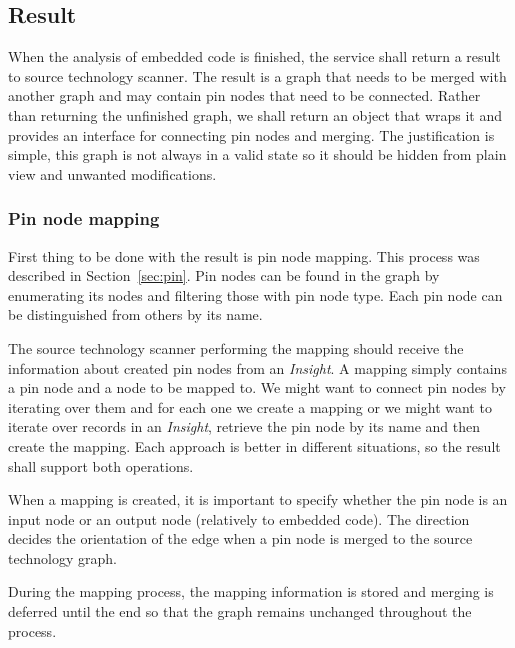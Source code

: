 \subsection{Result}

When the analysis of embedded code is finished, the service shall return a result to source technology scanner. The result is a graph that needs to be merged with another graph and may contain pin nodes that need to be connected. Rather than returning the unfinished graph, we shall return an object that wraps it and provides an interface for connecting pin nodes and merging. The justification is simple, this graph is not always in a valid state so it should be hidden from plain view and unwanted modifications.

\subsubsection{Pin node mapping}
First thing to be done with the result is pin node mapping. This process was described in Section~\ref{sec:pin}. Pin nodes can be found in the graph by enumerating its nodes and filtering those with pin node type. Each pin node can be distinguished from others by its name.
\par
The source technology scanner performing the mapping should receive the information about created pin nodes from an \textit{Insight}. A mapping simply contains a pin node and a node to be mapped to. We might want to connect pin nodes by iterating over them and for each one we create a mapping or we might want to iterate over records in an \textit{Insight}, retrieve the pin node by its name and then create the mapping. Each approach is better in different situations, so the result shall support both operations.
\par
When a mapping is created, it is important to specify whether the pin node is an input node or an output node (relatively to embedded code). The direction decides the orientation of the edge when a pin node is merged to the source technology graph.
\par
During the mapping process, the mapping information is stored and merging is deferred until the end so that the graph remains unchanged throughout the process.


